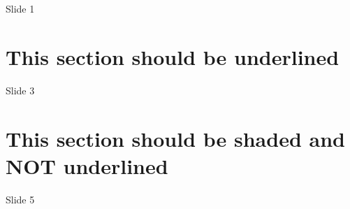 \documentclass{beamer}
\begin{document}
\begin{frame}
    Slide 1
\end{frame}

\section{This section should be underlined}
\begin{frame}
    Slide 3
\end{frame}

\section{This section should be shaded and NOT underlined}
\begin{frame}
    Slide 5
\end{frame}
\end{document}
